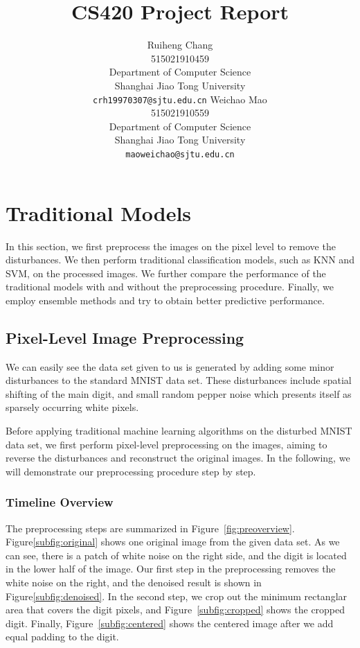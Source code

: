 \documentclass{article}
\title{CS420 Project Report}
\author{
  Ruiheng Chang \\
  515021910459\\
  Department of Computer Science\\
  Shanghai Jiao Tong University\\
  \texttt{crh19970307@sjtu.edu.cn}
  \And
  Weichao Mao \\
  515021910559\\
  Department of Computer Science\\
  Shanghai Jiao Tong University\\
  \texttt{maoweichao@sjtu.edu.cn}
}
\begin{document}

\maketitle

\section{Traditional Models}
In this section, we first preprocess the images on the pixel level to remove the disturbances. We then perform traditional classification models, such as KNN and SVM, on the processed images. We further compare the performance of the traditional models with and without the preprocessing procedure. Finally, we employ ensemble methods and try to obtain better predictive performance.

\subsection{Pixel-Level Image Preprocessing}
We can easily see the data set given to us is generated by adding some minor disturbances to the standard MNIST data set. These disturbances include spatial shifting of the main digit, and small random pepper noise which presents itself as sparsely occurring white pixels. 

Before applying traditional machine learning algorithms on the disturbed MNIST data set, we first perform pixel-level preprocessing on the images, aiming to reverse the disturbances and reconstruct the original images. In the following, we will demonstrate our preprocessing procedure step by step.

\subsubsection{Timeline Overview}
The preprocessing steps are summarized in Figure~\ref{fig:preoverview}. Figure\ref{subfig:original} shows one original image from the given data set. As we can see, there is a patch of white noise on the right side, and the digit is located in the lower half of the image. Our first step in the preprocessing removes the white noise on the right, and the denoised result is shown in Figure\ref{subfig:denoised}. In the second step, we crop out the minimum rectanglar area that covers the digit pixels, and Figure~\ref{subfig:cropped} shows the cropped digit. Finally, Figure~\ref{subfig:centered} shows the centered image after we add equal padding to the digit. 
\end{document}
